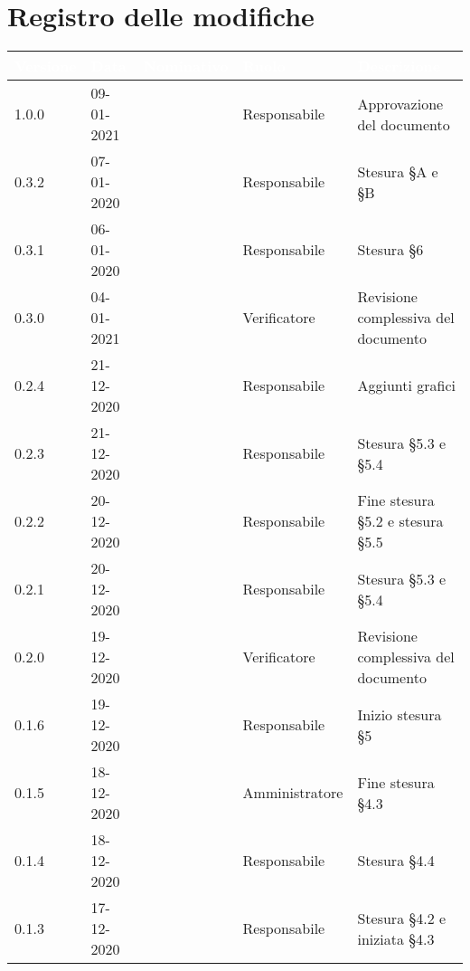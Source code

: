 \section*{Registro delle modifiche}
{
\renewcommand{\arraystretch}{1.5}
\centering
\begin{longtable}{C{1.7cm} C{2.5cm} C{3.2cm} C{2.7cm} C{4.8cm}}
\textcolor{white}{\textbf{Versione}}&
\textcolor{white}{\textbf{Data}}&
\textcolor{white}{\textbf{Nominativo}}&
\textcolor{white}{\textbf{Ruolo}}&
\textcolor{white}{\textbf{Descrizione}}\\	
\endhead

1.0.0 & 09-01-2021 & \SG{} & Responsabile & Approvazione del documento \\

0.3.2 & 07-01-2020 & \BM{} & Responsabile & Stesura \S A e \S B \\

0.3.1 & 06-01-2020 & \BM{} & Responsabile & Stesura \S 6\\

0.3.0 & 04-01-2021 & \SH{} & Verificatore & Revisione complessiva del documento \\

0.2.4 & 21-12-2020 & \SG{} & Responsabile & Aggiunti grafici \\

0.2.3 & 21-12-2020 & \BM{} & Responsabile & Stesura \S 5.3 e \S 5.4\\

0.2.2 & 20-12-2020 & \SG{} & Responsabile & Fine stesura \S 5.2 e stesura \S 5.5 \\

0.2.1 & 20-12-2020 & \BM{} & Responsabile & Stesura \S 5.3 e \S 5.4\\

0.2.0 & 19-12-2020 & \ZM{} & Verificatore & Revisione complessiva del documento \\

0.1.6 & 19-12-2020 & \SG{} & Responsabile & Inizio stesura \S 5 \\

0.1.5 & 18-12-2020 & \PA{} & Amministratore & Fine stesura \S 4.3\\

0.1.4 & 18-12-2020 & \SG{} & Responsabile & Stesura \S 4.4 \\

0.1.3 & 17-12-2020 & \BM{} & Responsabile & Stesura \S 4.2 e iniziata \S 4.3 \\


\end{longtable}}
